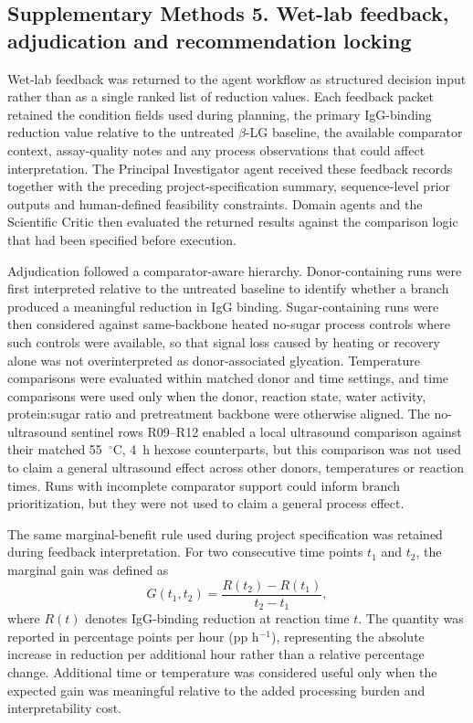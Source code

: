 \subsection*{Supplementary Methods 5. Wet-lab feedback, adjudication and recommendation locking}

Wet-lab feedback was returned to the agent workflow as structured decision input
rather than as a single ranked list of reduction values. Each feedback packet
retained the condition fields used during planning, the primary IgG-binding
reduction value relative to the untreated $\beta$-LG baseline, the available
comparator context, assay-quality notes and any process observations that could
affect interpretation. The Principal Investigator agent received these feedback records together with the preceding project-specification summary, sequence-level prior outputs and human-defined feasibility constraints. Domain agents and the Scientific Critic then evaluated the returned results against the comparison logic that had been specified before execution.

Adjudication followed a comparator-aware hierarchy. Donor-containing runs were
first interpreted relative to the untreated baseline to identify whether a branch
produced a meaningful reduction in IgG binding. Sugar-containing runs were then
considered against same-backbone heated no-sugar process controls where such
controls were available, so that signal loss caused by heating or recovery alone
was not overinterpreted as donor-associated glycation. Temperature comparisons
were evaluated within matched donor and time settings, and time comparisons were
used only when the donor, reaction state, water activity, protein:sugar ratio and
pretreatment backbone were otherwise aligned. The no-ultrasound sentinel rows
R09--R12 enabled a local ultrasound comparison against their matched 55~$^\circ$C,
4~h hexose counterparts, but this comparison was not used to claim a general
ultrasound effect across other donors, temperatures or reaction times. Runs with
incomplete comparator support could inform branch prioritization, but they were
not used to claim a general process effect.

The same marginal-benefit rule used during project specification was retained
during feedback interpretation. For two consecutive time points $t_1$ and $t_2$,
the marginal gain was defined as
\[
G(t_1,t_2)=\frac{R(t_2)-R(t_1)}{t_2-t_1},
\]
where $R(t)$ denotes IgG-binding reduction at reaction time $t$. The quantity was
reported in percentage points per hour (pp h$^{-1}$), representing the absolute
increase in reduction per additional hour rather than a relative percentage
change. Additional time or temperature was considered useful only when the
expected gain was meaningful relative to the added processing burden and
interpretability cost.

